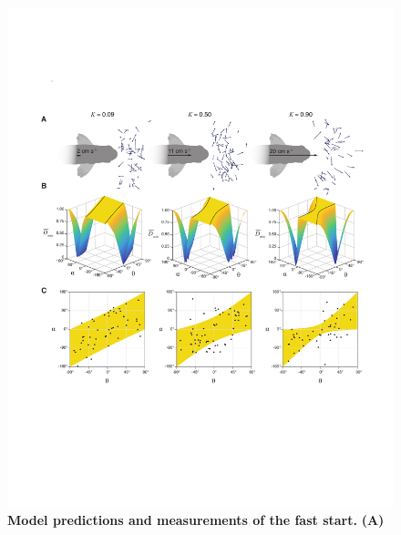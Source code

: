 \documentclass[12pt]{article}
\begin{document}
\pagebreak
\begin{figure}[t]
\begin{centering}
\includegraphics[width=1\textwidth]{Fig_02.pdf}
\centering	
\caption{\textbf{Model predictions and measurements of the fast start.} \textbf{(A)}  }
\label{weihs_topo}
\end{centering}
\end{figure}









\end{document}
